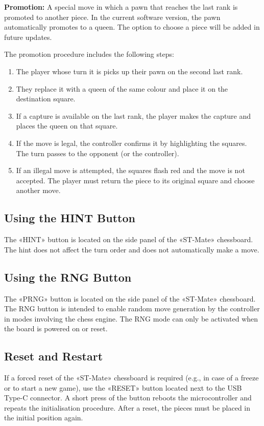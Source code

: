 \documentclass[a4paper,12pt]{article}
\begin{document}
\textbf{Promotion:} A special move in which a pawn that reaches the last rank is promoted to another piece.
In the current software version, the pawn automatically promotes to a queen. The option to choose a piece will be added in future updates.

The promotion procedure includes the following steps:
\begin{enumerate}
    \item The player whose turn it is picks up their pawn on the second last rank.
    \item They replace it with a queen of the same colour and place it on the destination square.
    \item If a capture is available on the last rank, the player makes the capture and places the queen on that square.
    \item If the move is legal, the controller confirms it by highlighting the squares. The turn passes to the opponent (or the controller).
    \item If an illegal move is attempted, the squares flash red and the move is not accepted. The player must return the piece to its original square and choose another move.
\end{enumerate}

\subsection{Using the HINT Button}
The «HINT» button is located on the side panel of the «ST-Mate» chessboard.
The hint does not affect the turn order and does not automatically make a move.

\subsection{Using the RNG Button}
The «PRNG» button is located on the side panel of the «ST-Mate» chessboard.
The RNG button is intended to enable random move generation by the controller in modes involving the chess engine.
The RNG mode can only be activated when the board is powered on or reset.

\subsection{Reset and Restart}
If a forced reset of the «ST-Mate» chessboard is required (e.g., in case of a freeze or to start a new game), use the «RESET» button located next to the USB Type-C connector.
A short press of the button reboots the microcontroller and repeats the initialisation procedure.
After a reset, the pieces must be placed in the initial position again.
\end{document}
